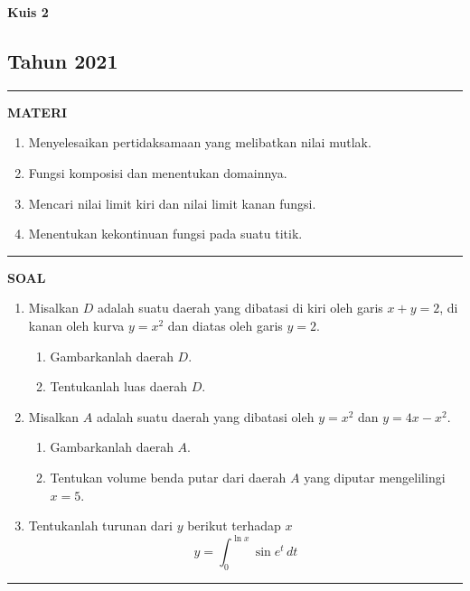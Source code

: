 \begin{flushright}
    \textbf{\Large{Kuis 2}}
    \subsection*{Tahun 2021}
\end{flushright}
\vspace{0.5cm}
\hrule height 2pt
\vspace{0.5cm}
\begin{center}
    \textbf{\large{MATERI}}
    \begin{enumerate}[leftmargin=*, label={\arabic*}.]
        \item Menyelesaikan pertidaksamaan yang melibatkan nilai mutlak.
        \item Fungsi komposisi dan menentukan domainnya.
        \item Mencari nilai limit kiri dan nilai limit kanan fungsi.
        \item Menentukan kekontinuan fungsi pada suatu titik.
    \end{enumerate}
\end{center}
\vspace{0.2cm}
\hrule height 1pt
\vspace{0.5cm}
\begin{center}
    \textbf{\large{SOAL}}
\end{center}
\begin{enumerate}[leftmargin=*, label={\arabic*}.]
\item Misalkan $D$ adalah suatu daerah yang dibatasi di kiri oleh garis $x+y=2$, 
di kanan oleh kurva $y=x^{2}$ dan diatas oleh garis $y=2$.
\begin{enumerate}[label={\alph*}.]
    \item Gambarkanlah daerah $D$.
    \item Tentukanlah luas daerah $D$.
\end{enumerate}
\item Misalkan $A$ adalah suatu daerah yang dibatasi oleh $y=x^{2}$ dan $y=4x-x^{2}$.
\begin{enumerate}[label={\alph*}.]
    \item Gambarkanlah daerah $A$.
    \item Tentukan volume benda putar dari daerah $A$ yang diputar mengelilingi $x=5$.
\end{enumerate}
\item Tentukanlah turunan dari $y$ berikut terhadap $x$
\[
y = \int_{0}^{\ln x}\sin e^{t}\,dt
\]
\end{enumerate}
\vspace{0.2cm}
\hrule height 1pt
\vspace{0.5cm}


